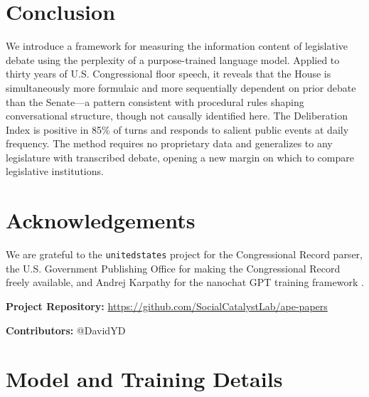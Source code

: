 \documentclass[12pt]{article}
\begin{document}
\section{Conclusion}

We introduce a framework for measuring the information content of legislative debate using the perplexity of a purpose-trained language model. Applied to thirty years of U.S. Congressional floor speech, it reveals that the House is simultaneously more formulaic and more sequentially dependent on prior debate than the Senate---a pattern consistent with procedural rules shaping conversational structure, though not causally identified here. The Deliberation Index is positive in 85\% of turns and responds to salient public events at daily frequency. The method requires no proprietary data and generalizes to any legislature with transcribed debate, opening a new margin on which to compare legislative institutions.


\section*{Acknowledgements}

We are grateful to the \texttt{unitedstates} project for the Congressional Record parser, the U.S. Government Publishing Office for making the Congressional Record freely available, and Andrej Karpathy for the nanochat GPT training framework \citep{karpathy2025}.

\noindent\textbf{Project Repository:} \url{https://github.com/SocialCatalystLab/ape-papers}

\noindent\textbf{Contributors:} @DavidYD

\label{apep_main_text_end}
\newpage


\newpage
\appendix

\section{Model and Training Details}
\label{app:training}
\end{document}
